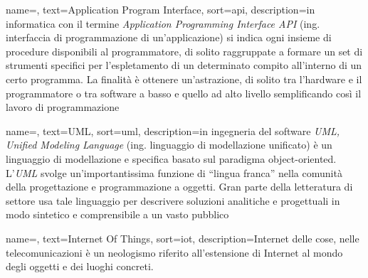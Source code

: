 
\renewcommand{\acronymname}{Acronimi e abbreviazioni}








{
    name=,
    text=Application Program Interface,
    sort=api,
    description={in informatica con il termine \emph{Application Programming Interface API} (ing. interfaccia di programmazione di un'applicazione) si indica ogni insieme di procedure disponibili al programmatore, di solito raggruppate a formare un set di strumenti specifici per l'espletamento di un determinato compito all'interno di un certo programma. La finalità è ottenere un'astrazione, di solito tra l'hardware e il programmatore o tra software a basso e quello ad alto livello semplificando così il lavoro di programmazione}
}

{
    name=,
    text=UML,
    sort=uml,
    description={in ingegneria del software \emph{UML, Unified Modeling Language} (ing. linguaggio di modellazione unificato) è un linguaggio di modellazione e specifica basato sul paradigma object-oriented. L'\emph{UML} svolge un'importantissima funzione di ``lingua franca'' nella comunità della progettazione e programmazione a oggetti. Gran parte della letteratura di settore usa tale linguaggio per descrivere soluzioni analitiche e progettuali in modo sintetico e comprensibile a un vasto pubblico}
}

{
    name=,
    text=Internet Of Things,
    sort=iot,
    description={Internet delle cose, nelle telecomunicazioni è un neologismo riferito all'estensione di Internet al mondo degli oggetti 
                e dei luoghi concreti.}
}


